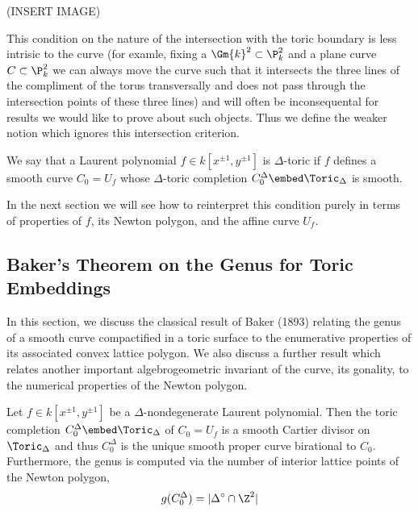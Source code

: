\documentclass[12pt]{article}
\begin{document}
(INSERT IMAGE)

This condition on the nature of the intersection with the toric boundary is less intrisic to the curve (for examle, fixing a $\Gm{k}^2 \subset \P^2_k$ and a plane curve $C \subset \P^2_k$ we can always move the curve such that it intersects the three lines of the compliment of the torus transversally and does not pass through the intersection points of these three lines) and will often be inconsequental for results we would like to prove about such objects. Thus we define the weaker notion which ignores this intersection criterion.

\begin{defn}
We say that a Laurent polynomial $f \in k[x^{\pm 1}, y^{\pm 1}]$ is $\Delta$-toric if $f$ defines a smooth curve $C_0 = U_f$ whose $\Delta$-toric completion $C^\Delta_0 \embed \Toric_\Delta$ is smooth.
\end{defn}
\noindent
In the next section we will see how to reinterpret this condition purely in terms of properties of $f$, its Newton polygon, and the affine curve $U_f$.


\subsection{Baker's Theorem on the Genus for Toric Embeddings}

In this section, we discuss the classical result of Baker (1893) relating the genus of a smooth curve compactified in a toric surface to the enumerative properties of its associated convex lattice polygon. We also discuss a further result which relates another important algebrogeometric invariant of the curve, its gonality, to the numerical properties of the Newton polygon.

\begin{thm}[Baker]
Let $f \in k[x^{\pm 1}, y^{\pm 1}]$ be a $\Delta$-nondegenerate Laurent polynomial. Then the toric completion $C_0^\Delta \embed \Toric_\Delta$ of $C_0 = U_f$ is a smooth Cartier divisor on $\Toric_\Delta$ and thus $C_0^\Delta$ is the unique smooth proper curve birational to $C_0$. Furthermore, the genus is computed via the number of interior lattice points of the Newton polygon, 
\[ g(C_0^\Delta) = |\Delta^\circ \cap \Z^2| \]
\end{thm}
\end{document}
